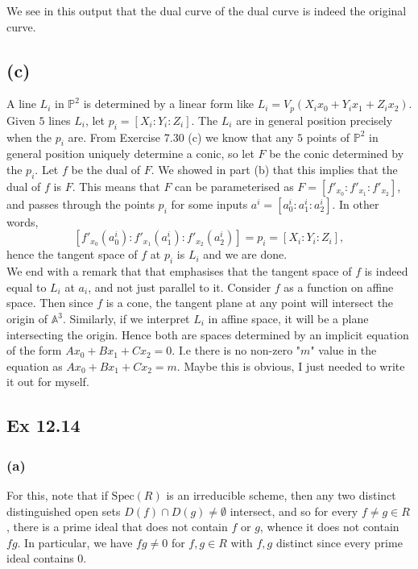 \documentclass{article}
\theoremstyle{definition}
\renewcommand{\P}{\mathbb{P}}
\newcommand{\A}{\mathbb{A}}
\renewcommand{\AA}[1]{\A^{#1}}
\newcommand{\PP}[1]{\P^{#1}}
\newcommand{\Spec}{\text{Spec}}
\begin{document}
We see in this output that the dual curve of the dual curve is indeed the
original curve.

\subsection*{(c)}

A line $L_i$ in $\PP{2}$ is determined by a linear form like $L_i = V_p(X_i x_0
+ Y_i x_1 + Z_i x_2)$. Given $5$ lines $L_i$, let $p_i = [X_i : Y_i : Z_i]$.
The $L_i$ are in general position precisely when the $p_i$ are. From Exercise
7.30 (c) we know that any $5$ points of $\PP{2}$ in general position uniquely
determine a conic, so let $F$ be the conic determined by the $p_i$. Let $f$ be
the dual of $F$. We showed in part (b) that this implies that the dual of $f$
is $F$. This means that $F$ can be parameterised as $F = [f'_{x_0} : f'_{x_1} :
f'_{x_2}]$, and passes through the points $p_i$ for some inputs $a^i = [a^i_0 :
a^i_1 : a^i_2]$. In other words, 
\[
	[f'_{x_0}(a^i_0) : f'_{x_1}(a^i_1) : f'_{x_2}(a^i_2)]
	=
	p_i
	=
	[X_i : Y_i : Z_i],
\]
hence the tangent space of $f$ at $p_i$ is $L_i$ and we are done. \\

We end with a remark that that emphasises that the tangent space of $f$ is
indeed equal to $L_i$ at $a_i$, and not just parallel to it. Consider $f$ as a
function on affine space. Then since $f$ is a cone, the tangent plane at any
point will intersect the origin of $\AA{3}$. Similarly, if we interpret $L_i$
in affine space, it will be a plane intersecting the origin. Hence both are
spaces determined by an implicit equation of the form $Ax_0 + Bx_1 + C x_2 =
0$. I.e there is no non-zero "$m$" value in the equation as $Ax_0 + Bx_1 + C
x_2 = m$. Maybe this is obvious, I just needed to write it out for myself. 


\subsection*{Ex 12.14}

\subsubsection*{(a)}

For this, note that if $\Spec(R)$ is an irreducible scheme, then any two
distinct distinguished open sets $D(f) \cap D(g) \not = \emptyset$ intersect,
and so for every $f \not = g \in R$, there is a prime ideal that does not
contain $f$ or $g$, whence it does not contain $fg$. In particular, we have $fg
\not = 0$ for $f, g \in R$ with $f, g$ distinct since every prime ideal
contains $0$. \\
\end{document}
